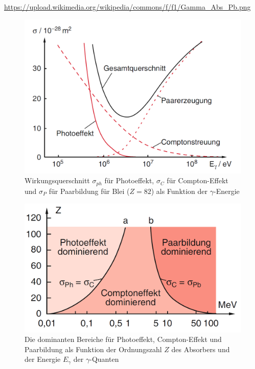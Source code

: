 		\url{https://upload.wikimedia.org/wikipedia/commons/f/f1/Gamma_Abs_Pb.png}
		\begin{figure}[htb]
			\centering
			\includegraphics[scale = 0.4]{pic/sigma-funktion.PNG}
			\caption{Wirkungsquerschnitt $\sigma_{ph}$ für Photoeffekt, $\sigma_C$ für Compton-Effekt und $\sigma_P$ für Paarbildung für Blei ($Z = 82$) als Funktion der $\gamma$-Energie}
			\label{fig:pb-absorb}
		\end{figure}

		\begin{figure}[htb]
			\centering
			\includegraphics[scale = 0.35]{pic/sigma-bereiche.PNG}
			\caption{Die dominanten Bereiche für Photoeffekt, Compton-Effekt und Paarbildung als Funktion der Ordnungszahl $Z$ des Absorbers und der Energie $E_\gamma$ der $\gamma$-Quanten}
			\label{fig:sigber}
		\end{figure}

